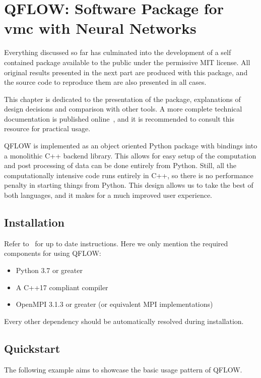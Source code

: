 \documentclass[Thesis.tex]{subfiles}
\begin{document}
\chapter{QFLOW: Software Package for \gls{vmc} with Neural Networks}
\label{chp:qflow}

Everything discussed so far has culminated into the development of a self
contained package available to the public under the permissive MIT license. All
original results presented in the next part are produced with this package, and
the source code to reproduce them are also presented in all cases.

This chapter is dedicated to the presentation of the package, explanations of
design decisions and comparison with other tools. A more complete technical
documentation is published online~\cite{qflow}, and it is recommended to consult this
resource for practical usage.

QFLOW is implemented as an object oriented Python package with bindings into a monolithic C++
backend library. This allows for easy setup of the computation and post
processing of data can be done entirely from Python. Still, all the
computationally intensive code runs entirely in C++, so there is no performance
penalty in starting things from Python. This design allows us to take the best
of both languages, and it makes for a much improved user experience.

\section{Installation}

Refer to~\cite{qflow} for up to date instructions. Here we only mention the
required components for using QFLOW:

\begin{itemize}
  \item Python 3.7 or greater
  \item A C++17 compliant compiler
  \item OpenMPI 3.1.3 or greater (or equivalent MPI implementations)
\end{itemize}
Every other dependency should be automatically resolved during installation.

\section{Quickstart}

The following example aims to showcase the basic usage pattern of QFLOW.
\end{document}
